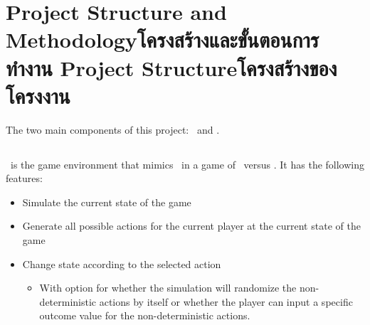 \chapter{\ifproject%
\ifenglish Project Structure and Methodology\else โครงสร้างและขั้นตอนการทำงาน\fi
\else%
\ifenglish Project Structure\else โครงสร้างของโครงงาน\fi
\fi
}

The two main components of this project: \RootOurs \ and \RootAI.


\makeatletter


\makeatother

\section{\RootOurs}
\RootOurs \ is the game environment that mimics \RootV \ in a game of \Marquise \ versus \Eyrie. It has the following features:
\begin{itemize}
  \item Simulate the current state of the game
  \item Generate all possible actions for the current player at the current state of the game
  \item Change state according to the selected action 
  \begin{itemize}
    \item With option for whether the simulation will randomize the non-deterministic actions by itself or whether the player can input a specific outcome value for the non-deterministic actions.
  \end{itemize}
\end{itemize}


